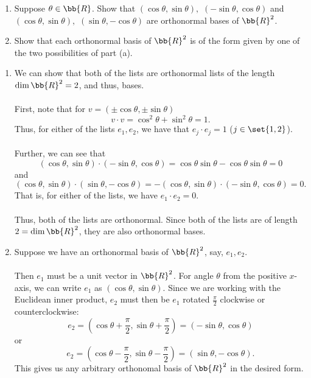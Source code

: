 \documentclass[12pt, letterpaper]{hmcpset}
\begin{document}
\begin{problem}[1]
	\begin{enumerate}
		\item
			Suppose $\theta \in \bb{R}$. Show that $(\cos{\theta}, \sin{\theta}),$ $(-\sin{\theta}, \cos{\theta})$ and $(\cos{\theta}, \sin{\theta}),$ $(\sin{\theta}, - \cos{\theta})$ are orthonormal bases of $\bb{R}^2$.
		\item
			Show that each orthonormal basis of $\bb{R}^2$ is of the form given by one of the two possibilities of part (a).
	\end{enumerate}
\end{problem}

\begin{solution}
	\begin{enumerate}
		\item
			We can show that both of the lists are orthonormal lists of the length $\dim \bb{R}^2 = 2$, and thus, bases.\\\\
			First, note that for $v = (\pm \cos{\theta}, \pm \sin{\theta})$
			\[
				v \cdot v = \cos^2{\theta} + \sin^2{\theta} = 1.
			\]
			Thus, for either of the lists $e_1, e_2$, we have that $e_j \cdot e_j = 1$ ($j \in \set{1, 2}$).\\\\
			Further, we can see that 
			\[
				(\cos{\theta}, \sin{\theta}) \cdot (- \sin{\theta}, \cos{\theta}) = \cos{\theta} \sin{\theta} - \cos{\theta} \sin{\theta} = 0
			\]
			and
			\[
				(\cos{\theta}, \sin{\theta}) \cdot (\sin{\theta}, -\cos{\theta}) = -(\cos{\theta}, \sin{\theta}) \cdot (- \sin{\theta}, \cos{\theta}) = 0.
			\]
			That is, for either of the lists, we have $e_1 \cdot e_2 = 0$.\\\\
			Thus, both of the lists are orthonormal. Since both of the lists are of length $2 = \dim \bb{R}^2$, they are also orthonormal bases.
		\item
			Suppose we have an orthonormal basis of $\bb{R}^2$, say, $e_1, e_2$.\\\\
			Then $e_1$ must be a unit vector in $\bb{R}^2$. For angle $\theta$ from the positive $x$-axis, we can write $e_1$ as $(\cos{\theta}, \sin{\theta})$. Since we are working with the Euclidean inner product, $e_2$ must then be $e_1$ rotated $\frac{\pi}{2}$ clockwise or counterclockwise:
			\[
				e_2 = (\cos{\theta + \frac{\pi}{2}}, \sin{\theta + \frac{\pi}{2}}) = (-\sin{\theta}, \cos{\theta})
			\]
			or
			\[
				e_2 = (\cos{\theta - \frac{\pi}{2}}, \sin{\theta - \frac{\pi}{2}}) = (\sin{\theta}, -\cos{\theta}).
			\]
			This gives us any arbitrary orthonomal basis of $\bb{R}^2$ in the desired form.
	\end{enumerate}
\end{solution}
\end{document}
